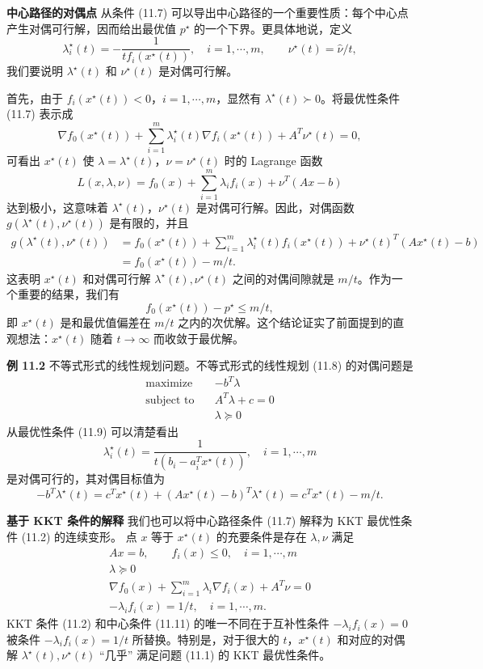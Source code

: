 \documentclass[UTF8, 12pt, fontset=fandol, oneside]{ctexart}
\begin{document}
\noindent\textbf{中心路径的对偶点}\quad
从条件 (11.7) 可以导出中心路径的一个重要性质：每个中心点产生对偶可行解，因而给出最优值 $p^\star$ 的一个下界。更具体地说，定义
\begin{equation}
\lambda_i^\star(t)=-\frac{1}{tf_i(x^\star(t))},\quad i=1,\cdots,m,\qquad \nu^\star(t)=\hat{\nu}/t,
\tag{11.10}
\end{equation}
我们要说明 $\lambda^\star(t)$ 和 $\nu^\star(t)$ 是对偶可行解。

首先，由于 $f_i(x^\star(t))<0$，$i=1,\cdots,m$，显然有 $\lambda^\star(t)\succ 0$。将最优性条件 (11.7) 表示成
\[
\nabla f_0(x^\star(t))+\sum_{i=1}^m\lambda_i^\star(t)\nabla f_i(x^\star(t))+A^T\nu^\star(t)=0,
\]
可看出 $x^\star(t)$ 使 $\lambda=\lambda^\star(t)$，$\nu=\nu^\star(t)$ 时的 Lagrange 函数
\[
L(x,\lambda,\nu)=f_0(x)+\sum_{i=1}^m\lambda_if_i(x)+\nu^T(Ax-b)
\]
达到极小，这意味着 $\lambda^\star(t)$，$\nu^\star(t)$ 是对偶可行解。因此，对偶函数 $g(\lambda^\star(t),\nu^\star(t))$ 是有限的，并且
\[
\begin{aligned}
g(\lambda^\star(t),\nu^\star(t))
&=f_0(x^\star(t))+\sum_{i=1}^m\lambda_i^\star(t)f_i(x^\star(t))+\nu^\star(t)^T(Ax^\star(t)-b)\\
&=f_0(x^\star(t))-m/t.
\end{aligned}
\]
这表明 $x^\star(t)$ 和对偶可行解 $\lambda^\star(t),\nu^\star(t)$ 之间的对偶间隙就是 $m/t$。作为一个重要的结果，我们有
\[
f_0(x^\star(t))-p^\star\leq m/t,
\]
即 $x^\star(t)$ 是和最优值偏差在 $m/t$ 之内的次优解。这个结论证实了前面提到的直观想法：$x^\star(t)$ 随着 $t\to\infty$ 而收敛于最优解。

\noindent\textbf{例 11.2}\quad
不等式形式的线性规划问题。不等式形式的线性规划 (11.8) 的对偶问题是
\[
\begin{aligned}
\text{maximize}\quad & -b^T\lambda\\
\text{subject to}\quad & A^T\lambda+c=0\\
& \lambda\succeq 0
\end{aligned}
\]
从最优性条件 (11.9) 可以清楚看出
\[
\lambda_i^\star(t)=\frac{1}{t(b_i-a_i^Tx^\star(t))},\quad i=1,\cdots,m
\]
是对偶可行的，其对偶目标值为
\[
-b^T\lambda^\star(t)=c^Tx^\star(t)+(Ax^\star(t)-b)^T\lambda^\star(t)=c^Tx^\star(t)-m/t.
\]

\noindent\textbf{基于 KKT 条件的解释}\quad
我们也可以将中心路径条件 (11.7) 解释为 KKT 最优性条件 (11.2) 的连续变形。
点 $x$ 等于 $x^\star(t)$ 的充要条件是存在 $\lambda,\nu$ 满足
\begin{equation}
\begin{gathered}
Ax=b,\qquad f_i(x)\leq 0,\quad i=1,\cdots,m\\
\lambda\succeq 0\\
\nabla f_0(x)+\sum_{i=1}^m\lambda_i\nabla f_i(x)+A^T\nu=0\\
-\lambda_i f_i(x)=1/t,\quad i=1,\cdots,m.
\end{gathered}
\tag{11.11}
\end{equation}
KKT 条件 (11.2) 和中心条件 (11.11) 的唯一不同在于互补性条件 $-\lambda_i f_i(x)=0$ 被条件 $-\lambda_i f_i(x)=1/t$ 所替换。特别是，对于很大的 $t$，$x^\star(t)$ 和对应的对偶解 $\lambda^\star(t),\nu^\star(t)$ ``几乎'' 满足问题 (11.1) 的 KKT 最优性条件。
\end{document}
